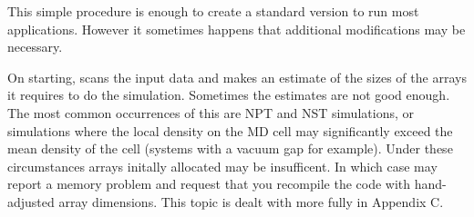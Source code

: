 This simple procedure is enough to create a standard version to run
most \D{} applications. However it sometimes happens that additional
modifications may be necessary. 

On starting, \D{} scans the input data and makes an estimate of the
sizes of the arrays it requires to do the simulation. Sometimes the
estimates are not good enough. The most common occurrences of this are
NPT and NST simulations, or simulations where the local density on the
MD cell may significantly exceed the mean density of the cell (systems
with a vacuum gap for example). Under these circumstances arrays
initally allocated may be insufficent. In which case \D{} may report a
memory problem and request that you recompile the code with
hand-adjusted array dimensions. This topic is dealt with more fully in
Appendix C.

